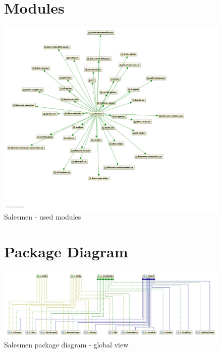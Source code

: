 \documentclass[salesmen, twoside]{../../../templates/latex/2009/softproj}
\begin{document}
\begin{projdoc}
\begin{figure}
\section{Modules}
\label{fig_modules}
\includegraphics[scale=0.5]{../../img/salesmen_modules.png}
\caption{Salesmen - used modules}
\end{figure}

\begin{figure}
\section{Package Diagram}
\label{fig_package_entity}
\includegraphics[scale=0.4,angle=90]{../../img/salesmen_package_entity.png}
\caption{Salesmen package diagram - global view}
\end{figure}

\clearpage
\begin{figure}

\end{figure}
\end{projdoc}
\end{document}
